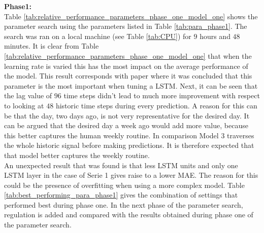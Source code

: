 \textbf{Phase1:}\\
Table \ref{tab:relative_performance_parameters_phase_one_model_one} shows the parameter search using the parameters listed in Table \ref{tab:para_phase1}. The search was ran on a local machine (see Table \ref{tab:CPU}) for $ 9 $ hours and $ 48 $ minutes. It is clear from Table \ref{tab:relative_performance_parameters_phase_one_model_one} that when the learning rate is varied this has the most impact on the average performance of the model. This result corresponds with paper \cite{Greff2017} where it was concluded that this parameter is the most important when tuning a LSTM. Next, it can be seen that the lag value of $ 96 $ time steps didn't lead to much more improvement with respect to looking at $ 48 $ historic time steps during every prediction. A reason for this can be that the day, two days ago, is not very representative for the desired day. It can be argued that the desired day a week ago would add more value, because this better captures the human weekly routine. In comparison Model $ 3 $ traverses the whole historic signal before making predictions. It is therefore expected that that model better captures the weekly routine.\\
An unexpected result that was found is that less LSTM units and only one LSTM layer in the case of Serie 1 gives raise to a lower MAE. The reason for this could be the presence of overfitting when using a more complex model. Table \ref{tab:best_performing_para_phase1} gives the combination of settings that performed best during phase one. In the next phase of the parameter search, regulation is added and compared with the results obtained during phase one of the parameter search. \\

